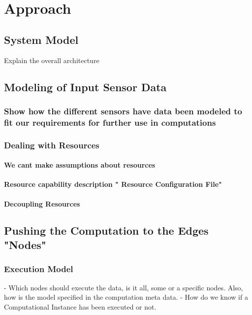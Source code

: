 
\chapter{Approach}\label{chapter:Approach}
\section{System Model }
Explain the overall architecture 


\section{Modeling of Input Sensor Data}
\subsection{Show how the different sensors have data been modeled to fit our requirements for further use in computations}
\subsection{Dealing with Resources}
\subsubsection{We cant make assumptions about resources}
\subsubsection{Resource capability description " Resource Configuration File"}
\subsubsection{Decoupling Resources}



\section{Pushing the Computation to the Edges "Nodes"}

\subsection{Execution Model}
- Which nodes should execute the data, is it all, some  or a specific nodes. Also, how is the model specified in the computation meta data.
- How do we know if a Computational Instance has been executed or not.
